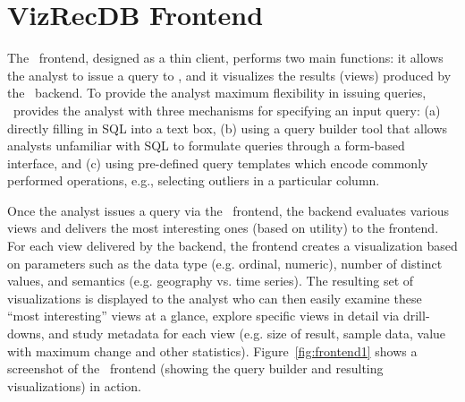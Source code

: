 

\section{VizRecDB Frontend}
\label{sec:VizRecDB_frontend}

The \VizRecDB\ frontend, designed as a thin client, performs two main functions: it
allows the analyst to issue a query to \VizRecDB, 
and it visualizes the results (views) produced by the \VizRecDB\
backend.
To provide the analyst maximum flexibility in issuing queries, \VizRecDB\
provides the analyst with three
mechanisms for specifying an input query: 
(a) directly filling in SQL into a text box, 
(b) using a query builder tool that allows analysts
unfamiliar with SQL to formulate queries through a form-based interface, and (c)
using pre-defined query templates which encode commonly performed operations,
e.g., selecting outliers in a particular column. 

Once the analyst issues a query via the \VizRecDB\ frontend, the backend
evaluates various views and delivers the most interesting ones (based on
utility) to the frontend.
For each view delivered by the backend, the frontend creates a visualization
based on parameters such as the data
type (e.g. ordinal, numeric), number of distinct values, and semantics (e.g.
geography vs. time series).
The resulting set of visualizations is displayed to the analyst who can then
easily examine these ``most interesting'' views at a glance, explore specific views in
detail via drill-downs, 
and study metadata for each view (e.g. size of result, sample data, value with
maximum change and other statistics). 
Figure~\ref{fig:frontend1} shows a screenshot of the \VizRecDB\ frontend (showing
the query builder and resulting visualizations) in action.
 
